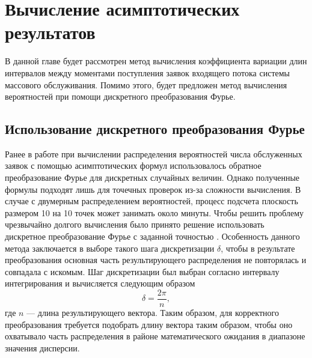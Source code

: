 \section {Вычисление асимптотических результатов}
В данной главе будет рассмотрен метод вычисления коэффициента вариации длин интервалов между моментами поступления заявок входящего потока системы массового обслуживания. Помимо этого, будет предложен метод вычисления вероятностей при помощи дискретного преобразования Фурье.
\subsection{Использование дискретного преобразования Фурье}
Ранее в работе \cite{blaginin2021approximation} при вычислении распределения вероятностей числа обслуженных заявок с помощью асимптотических формул использовалось обратное преобразование Фурье для дискретных случайных величин. Однако полученные формулы подходят лишь для точечных проверок из-за сложности вычисления. В случае с двумерным распределением вероятностей, процесс подсчета плоскость размером 10 на 10 точек может занимать около минуты. Чтобы решить проблему чрезвычайно долгого вычисления было принято решение использовать дискретное преобразование Фурье с заданной точностью \cite{nussbaumer1981fast,bergland1969guided}. Особенность данного метода заключается в выборе такого шага дискретизации $\delta$, чтобы в результате преобразования основная часть результирующего распределения не повторялась и совпадала с искомым. Шаг дискретизации был выбран согласно интервалу интегрирования и вычисляется следующим образом
\begin{equation*}
	\delta = \frac{2\pi}{n},
\end{equation*}
где $n$ --- длина результирующего вектора. Таким образом, для корректного преобразования требуется подобрать длину вектора таким образом, чтобы оно охватывало часть распределения в районе математического ожидания в диапазоне значения дисперсии. 

